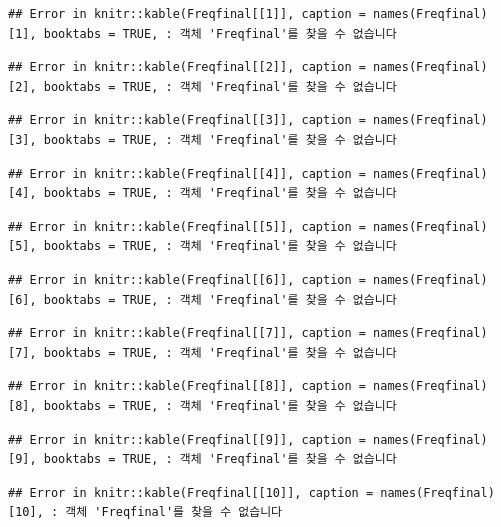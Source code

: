 \documentclass[10pt,]{krantz}
\begin{document}
\begin{verbatim}
## Error in knitr::kable(Freqfinal[[1]], caption = names(Freqfinal)[1], booktabs = TRUE, : 객체 'Freqfinal'를 찾을 수 없습니다
\end{verbatim}

\begin{verbatim}
## Error in knitr::kable(Freqfinal[[2]], caption = names(Freqfinal)[2], booktabs = TRUE, : 객체 'Freqfinal'를 찾을 수 없습니다
\end{verbatim}

\begin{verbatim}
## Error in knitr::kable(Freqfinal[[3]], caption = names(Freqfinal)[3], booktabs = TRUE, : 객체 'Freqfinal'를 찾을 수 없습니다
\end{verbatim}

\begin{verbatim}
## Error in knitr::kable(Freqfinal[[4]], caption = names(Freqfinal)[4], booktabs = TRUE, : 객체 'Freqfinal'를 찾을 수 없습니다
\end{verbatim}

\begin{verbatim}
## Error in knitr::kable(Freqfinal[[5]], caption = names(Freqfinal)[5], booktabs = TRUE, : 객체 'Freqfinal'를 찾을 수 없습니다
\end{verbatim}

\begin{verbatim}
## Error in knitr::kable(Freqfinal[[6]], caption = names(Freqfinal)[6], booktabs = TRUE, : 객체 'Freqfinal'를 찾을 수 없습니다
\end{verbatim}

\begin{verbatim}
## Error in knitr::kable(Freqfinal[[7]], caption = names(Freqfinal)[7], booktabs = TRUE, : 객체 'Freqfinal'를 찾을 수 없습니다
\end{verbatim}

\begin{verbatim}
## Error in knitr::kable(Freqfinal[[8]], caption = names(Freqfinal)[8], booktabs = TRUE, : 객체 'Freqfinal'를 찾을 수 없습니다
\end{verbatim}

\begin{verbatim}
## Error in knitr::kable(Freqfinal[[9]], caption = names(Freqfinal)[9], booktabs = TRUE, : 객체 'Freqfinal'를 찾을 수 없습니다
\end{verbatim}

\begin{verbatim}
## Error in knitr::kable(Freqfinal[[10]], caption = names(Freqfinal)[10], : 객체 'Freqfinal'를 찾을 수 없습니다
\end{verbatim}
\end{document}
